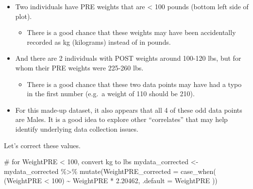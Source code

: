 \documentclass[
  letterpaper,
  DIV=11,
  numbers=noendperiod]{scrartcl}
\newenvironment{Shaded}{\begin{snugshade}}{\end{snugshade}}
\newcommand{\AttributeTok}[1]{\textcolor[rgb]{0.40,0.45,0.13}{#1}}
\newcommand{\CommentTok}[1]{\textcolor[rgb]{0.37,0.37,0.37}{#1}}
\newcommand{\DecValTok}[1]{\textcolor[rgb]{0.68,0.00,0.00}{#1}}
\newcommand{\FloatTok}[1]{\textcolor[rgb]{0.68,0.00,0.00}{#1}}
\newcommand{\FunctionTok}[1]{\textcolor[rgb]{0.28,0.35,0.67}{#1}}
\newcommand{\NormalTok}[1]{\textcolor[rgb]{0.00,0.23,0.31}{#1}}
\newcommand{\OtherTok}[1]{\textcolor[rgb]{0.00,0.23,0.31}{#1}}
\newcommand{\SpecialCharTok}[1]{\textcolor[rgb]{0.37,0.37,0.37}{#1}}
\providecommand{\tightlist}{%
  \setlength{\itemsep}{0pt}\setlength{\parskip}{0pt}}\usepackage{longtable,booktabs,array}
\begin{document}
\begin{itemize}
\tightlist
\item
  Two individuals have PRE weights that are \textless{} 100 pounds
  (bottom left side of plot).

  \begin{itemize}
  \tightlist
  \item
    There is a good chance that these weights may have been accidentally
    recorded as kg (kilograms) instead of in pounds.
  \end{itemize}
\item
  And there are 2 individuals with POST weights around 100-120 lbs, but
  for whom their PRE weights were 225-260 lbs.

  \begin{itemize}
  \tightlist
  \item
    There is a good chance that these two data points may have had a
    typo in the first number (e.g.~a weight of 110 should be 210).
  \end{itemize}
\item
  For this made-up dataset, it also appears that all 4 of these odd data
  points are Males. It is a good idea to explore other ``correlates''
  that may help identify underlying data collection issues.
\end{itemize}

Let's correct these values.

\begin{Shaded}
\begin{Highlighting}[]
\CommentTok{\# for WeightPRE \textless{} 100, convert kg to lbs}
\NormalTok{mydata\_corrected }\OtherTok{\textless{}{-}}\NormalTok{ mydata\_corrected }\SpecialCharTok{\%\textgreater{}\%}
  \FunctionTok{mutate}\NormalTok{(}\AttributeTok{WeightPRE\_corrected =} \FunctionTok{case\_when}\NormalTok{(}
\NormalTok{    (WeightPRE }\SpecialCharTok{\textless{}} \DecValTok{100}\NormalTok{) }\SpecialCharTok{\textasciitilde{}}\NormalTok{ WeightPRE }\SpecialCharTok{*} \FloatTok{2.20462}\NormalTok{,}
    \AttributeTok{.default =}\NormalTok{ WeightPRE}
\NormalTok{  ))}
\end{Highlighting}
\end{Shaded}
\end{document}

